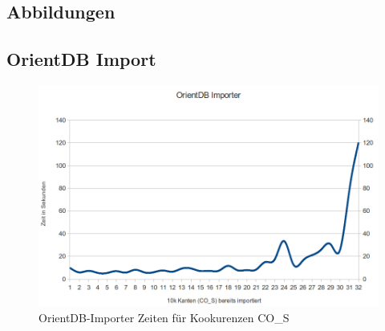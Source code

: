 \documentclass[11pt, a4paper, oneside]{article} %
\begin{document}
\begin{appendix}
\section{Abbildungen}
\subsection{OrientDB Import}
\label{anh:orientimport}

\begin{figure}[ht] 
	\centering
		\includegraphics[scale=.3]{OrientImporter.png}
	\caption{OrientDB-Importer Zeiten für Kookurenzen CO\_{}S}
	\label{fig:orientdb_import}
\end{figure}


\end{appendix}
\end{document}
